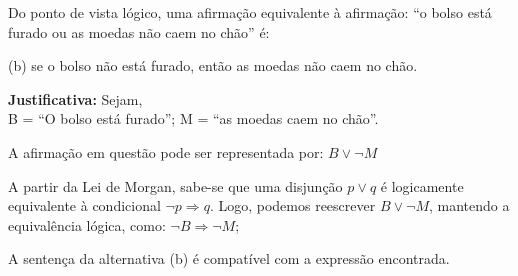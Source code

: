 \documentclass[12pt,letterpaper, onecolumn]{exam}
\begin{document}
\begin{questions}
\begin{solution}
    \end{solution}

    \pagebreak
    
    \question[q9] Do ponto de vista lógico, uma afirmação equivalente à afirmação: “o bolso está furado ou as moedas não caem no chão” é: 
    

    \begin{solution}
        (b) se o bolso não está furado, então as moedas não caem no chão.

        \textbf{Justificativa:} Sejam, \\[0.5em]
            B = “O bolso está furado”;  \hfill
            M = “as moedas caem no chão”.

        A afirmação em questão pode ser representada por: \( B \vee \neg M \)

        A partir da Lei de Morgan, sabe-se que uma disjunção \( p \vee q \) é logicamente equivalente à condicional \( \neg p \Rightarrow q \).
        Logo, podemos reescrever \( B \vee \neg M \), mantendo a equivalência lógica, como: \( \neg B \Rightarrow \neg M \);
        
        A sentença da alternativa (b) é compatível com a expressão encontrada.


\end{solution}
\end{questions}
\end{document}

